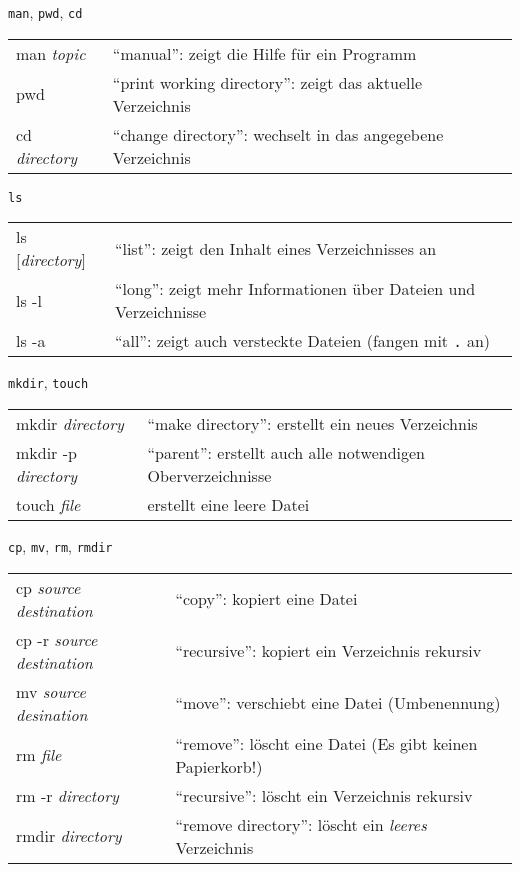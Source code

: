 \begin{frame}{\texttt{man}, \texttt{pwd}, \texttt{cd}}
  \begin{tabu}{>{\ttfamily}l X}
    man \textit{topic}    & \enquote{manual}: zeigt die Hilfe für ein Programm \\
    pwd                   & \enquote{print working directory}: zeigt das aktuelle Verzeichnis \\
    cd \textit{directory} & \enquote{change directory}: wechselt in das angegebene Verzeichnis
  \end{tabu}
\end{frame}

\begin{frame}{\texttt{ls}}
  \begin{tabu}{>{\ttfamily}l X}
    ls [\textit{directory}] & \enquote{list}: zeigt den Inhalt eines Verzeichnisses an \\
    ls -l                   & \enquote{long}: zeigt mehr Informationen über Dateien und Verzeichnisse \\
    ls -a                   & \enquote{all}: zeigt auch versteckte Dateien (fangen mit \texttt{.} an)
  \end{tabu}
\end{frame}

\begin{frame}{\texttt{mkdir}, \texttt{touch}}
  \begin{tabu}{>{\ttfamily}l X}
    mkdir \textit{directory}    & \enquote{make directory}: erstellt ein neues Verzeichnis \\
    mkdir -p \textit{directory} & \enquote{parent}: erstellt auch alle notwendigen Oberverzeichnisse \\
    touch \textit{file}         & erstellt eine leere Datei
  \end{tabu}
\end{frame}

\begin{frame}{\texttt{cp}, \texttt{mv}, \texttt{rm}, \texttt{rmdir}}
  \begin{tabu}{>{\ttfamily}l X}
    cp \textit{source} \textit{destination}    & \enquote{copy}: kopiert eine Datei \\
    cp -r \textit{source} \textit{destination} & \enquote{recursive}: kopiert ein Verzeichnis rekursiv \\
    mv \textit{source} \textit{desination}     & \enquote{move}: verschiebt eine Datei (Umbenennung) \\
    rm \textit{file}                           & \enquote{remove}: löscht eine Datei (Es gibt keinen Papierkorb!) \\
    rm -r \textit{directory}                   & \enquote{recursive}: löscht ein Verzeichnis rekursiv \\
    rmdir \textit{directory}                   & \enquote{remove directory}: löscht ein \emph{leeres} Verzeichnis
  \end{tabu}
\end{frame}

